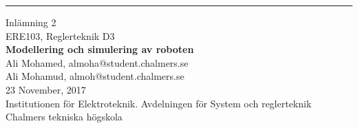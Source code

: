 \newcommand{\no}{2}
\newcommand{\subject}{Modellering och simulering av roboten}


\thispagestyle{empty}
\parbox[h!][\textheight][t]{\textwidth}{
\parbox[h!][\textheight][t]{0.19\textwidth}{

\vspace*{0.075\textheight}
\hspace*{0.15\textwidth}
\rule[\textheight]{1.5pt}{0.85\textheight}
}
\parbox[h!][0.85\textheight][t]{0.76\textwidth}{
\vspace{10em}

{\huge Inlämning \no} \\[0.1cm]
{\Large{ERE103, Reglerteknik D3}} \\[0.8cm]
{\Large \bf \subject} \\ [1cm]
{\Large Ali Mohamed, almoha@student.chalmers.se\\[0.3em]
Ali Mohamud, almoh@student.chalmers.se
\\[0.8cm]
23 November, 2017}
 \\[0.39\textheight]
Institutionen för Elektroteknik. Avdelningen för System och reglerteknik\\
Chalmers tekniska högskola
}}
\restoregeometry